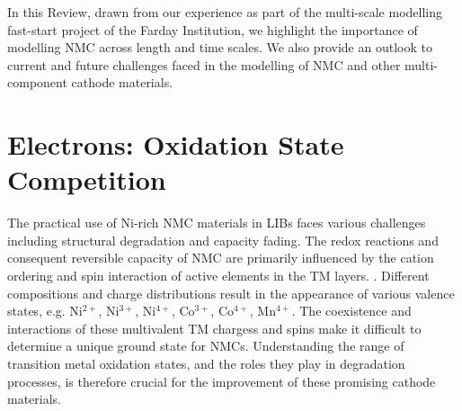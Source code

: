 \documentclass[journal=jacsat,manuscript=article]{achemso}
\begin{document}
In this Review, drawn from our experience as part of the multi-scale modelling fast-start project of the Farday Institution, we highlight the importance of modelling NMC across length and time scales. 
We also provide an outlook to current and future challenges faced in the modelling of NMC and other multi-component cathode materials.

\section*{Electrons: Oxidation State Competition}
The practical use of Ni-rich NMC materials in LIBs faces various challenges including structural degradation and capacity fading.  
The redox reactions and consequent reversible capacity of NMC are primarily influenced by the cation ordering and spin interaction of active elements in the TM layers. \cite{Li-acsami-2020,Maleki-aenm.2019,Feng-2019, Xia2018, Xiao_NanoEner2018}. 
Different compositions and charge distributions result in the appearance of various valence states, e.g. Ni$^{2+}$, Ni$^{3+}$, Ni$^{4+}$, Co$^{3+}$, Co$^{4+}$, Mn$^{4+}$. \cite{Xiao_NanoEner2018} 
The coexistence and interactions of these multivalent TM chargess and spins make it difficult to determine a unique ground state for NMCs. \cite{Xiao_NanoEner2018}
Understanding the range of transition metal oxidation states, and the roles they play in degradation processes, is therefore crucial for the improvement of these promising cathode materials.
\end{document}
